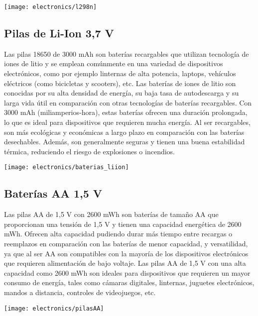 \begin{center}
  \centering
  \texttt{[image: electronics/l298n]}
  \label{fig:l298n}
\end{center}

\subsection{Pilas de Li-Ion 3,7 V}
Las pilas 18650 de 3000 mAh \cite{Baterias_LiIon_Datasheet} son baterías recargables que utilizan tecnología de iones de litio y se emplean comúnmente en una variedad de dispositivos electrónicos, como por ejemplo linternas de alta potencia, laptops, vehículos eléctricos (como bicicletas y scooters), etc. Las baterías de iones de litio son conocidas por su alta densidad de energía, su baja tasa de autodescarga y su larga vida útil en comparación con otras tecnologías de baterías recargables. Con 3000 mAh (miliamperios-hora), estas baterías ofrecen una duración prolongada, lo que es ideal para dispositivos que requieren mucha energía. Al ser recargables, son más ecológicas y económicas a largo plazo en comparación con las baterías desechables. Además, son generalmente seguras y tienen una buena estabilidad térmica, reduciendo el riesgo de explosiones o incendios.

\begin{center}
  \centering
  \texttt{[image: electronics/baterias\_liion]}
  \label{fig:baterias_liion}
\end{center}

\subsection{Baterías AA 1,5 V}

Las pilas AA de 1,5 V con 2600 mWh \cite{Baterias_AA_LiIon_Datasheet} son baterías de tamaño AA que proporcionan una tensión de 1,5 V y tienen una capacidad energética de 2600 mWh. Ofrecen alta capacidad  pudiendo durar más tiempo entre recargas o reemplazos en comparación con las baterías de menor capacidad, y versatilidad, ya que al ser AA son compatibles con la mayoría de los dispositivos electrónicos que requieren alimentación de bajo voltaje.
Las pilas AA de 1,5 V con una alta capacidad como 2600 mWh son ideales para dispositivos que requieren un mayor consumo de energía, tales como cámaras digitales, linternas, juguetes electrónicos, mandos a distancia, controles de videojuegos, etc.
\begin{center}
  \centering
  \texttt{[image: electronics/pilasAA]}
  \label{fig:pilasAA}
\end{center}


